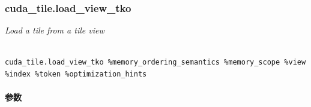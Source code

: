 \documentclass{article}
\begin{document}
\subsubsection{cuda\_tile.load\_view\_tko}


\textit{Load a tile from a tile view}




\begin{lstlisting}

cuda_tile.load_view_tko %memory_ordering_semantics %memory_scope %view %index %token %optimization_hints

\end{lstlisting}



\paragraph{参数}
\end{document}
